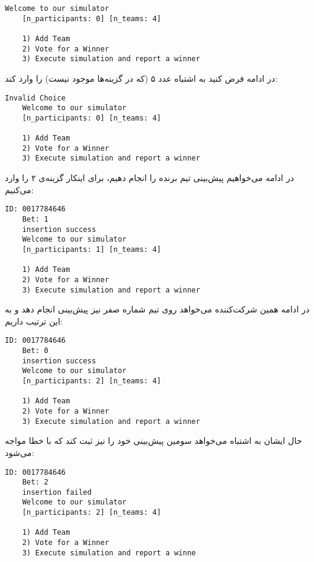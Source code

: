 \documentclass[../main.tex]{subfiles}
\begin{document}
\begin{latin}
\begin{lstlisting}[]
    Welcome to our simulator
    [n_participants: 0] [n_teams: 4]

    1) Add Team
    2) Vote for a Winner
    3) Execute simulation and report a winner
\end{lstlisting}
\end{latin}

در ادامه فرض کنید به اشتباه عدد ۵ (که در گزینه‌ها موجود نیست) را وارد کند:

\begin{latin}
\begin{lstlisting}[]
    Invalid Choice
    Welcome to our simulator
    [n_participants: 0] [n_teams: 4]

    1) Add Team
    2) Vote for a Winner
    3) Execute simulation and report a winner
\end{lstlisting}
\end{latin}

در ادامه می‌خواهیم پیش‌بینی تیم برنده را انجام دهیم، برای اینکار گزینه‌ی ۲ را وارد می‌کنیم:

\begin{latin}
\begin{lstlisting}[]
    ID: 0017784646
    Bet: 1
    insertion success
    Welcome to our simulator
    [n_participants: 1] [n_teams: 4]

    1) Add Team
    2) Vote for a Winner
    3) Execute simulation and report a winner
\end{lstlisting}
\end{latin}

در ادامه همین شرکت‌کننده می‌خواهد روی تیم شماره صفر نیز پیش‌بینی انجام دهد و به این ترتیب داریم:

\begin{latin}
\begin{lstlisting}[]
    ID: 0017784646
    Bet: 0
    insertion success
    Welcome to our simulator
    [n_participants: 2] [n_teams: 4]

    1) Add Team
    2) Vote for a Winner
    3) Execute simulation and report a winner
\end{lstlisting}
\end{latin}

حال ایشان به اشتباه می‌خواهد سومین پیش‌بینی خود را نیز ثبت کند که با خطا مواجه می‌شود:

\begin{latin}
\begin{lstlisting}[]
    ID: 0017784646
    Bet: 2
    insertion failed
    Welcome to our simulator
    [n_participants: 2] [n_teams: 4]

    1) Add Team
    2) Vote for a Winner
    3) Execute simulation and report a winne
\end{lstlisting}
\end{latin}
\end{document}
